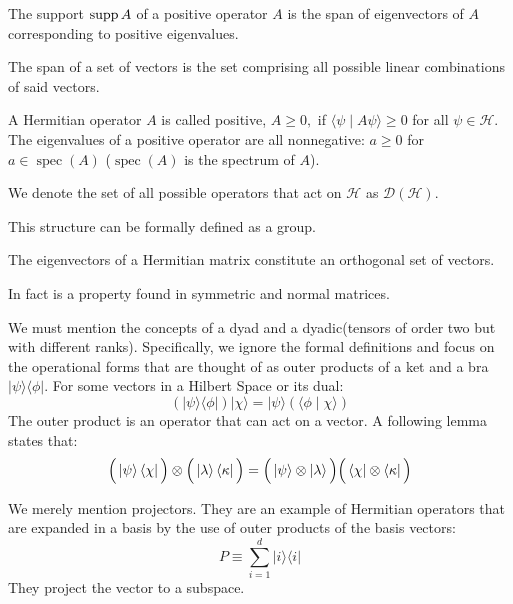 \begin{note}
The support $\operatorname{\textup{supp}} A$ of a positive operator $A$ is the span of eigenvectors of $A$ corresponding to positive eigenvalues.
\end{note}
\begin{note}
The span of a set of vectors is the set comprising all possible linear combinations of said vectors.
\end{note}
\begin{note}
A Hermitian operator $A$ is called positive, $A \geq 0,$ if $\langle\psi \mid A \psi\rangle \geq 0$ for all $\psi \in \mathcal{H}.$ The eigenvalues of a positive operator are all nonnegative: $a \geq 0$ for $a \in \operatorname{spec}(A)$ ($\operatorname{spec}(A)$ is the spectrum of $A$).
\end{note}
\begin{note}
We denote the set of all possible operators that act on $\mathcal{H}$ as $\mathcal{D}(\mathcal{H})$.
\end{note}
\noindent This structure can be formally defined as a group.\begin{note}
The eigenvectors of a Hermitian matrix constitute an orthogonal set of vectors.
\end{note}
\noindent In fact is a property found in symmetric and normal matrices.
\par
We must mention the concepts of a dyad and a dyadic(tensors of order two but with different ranks). Specifically, we ignore the formal definitions and focus on the operational forms that are thought of as outer products of a ket and a bra $|\psi\rangle\langle\phi|$. For some vectors in a Hilbert Space or its dual:$$(|\psi\rangle\langle\phi|)|\chi \rangle=|\psi\rangle(\langle\phi \mid \chi \rangle)$$
The outer product is an operator that can act on a vector. A following lemma states that:
$$
\Big( \ket{\psi} \bra{\chi} \Big) \otimes \Big( \ket{\lambda} \bra{\kappa} \Big)=\Big(\ket{\psi} \otimes \ket{\lambda}\Big) \Big(\bra{\chi} \otimes \bra{\kappa}\Big)
$$
\par
We merely mention projectors. They are an example of Hermitian operators that are expanded in a basis by the use of outer products of the basis vectors:
$$P \equiv \sum_{i=1}^{d}|i\rangle\langle i|$$
They project the vector to a subspace.
